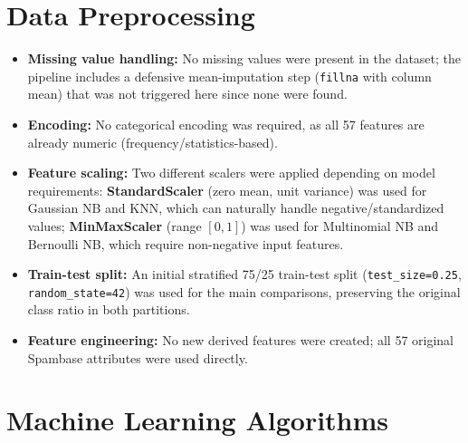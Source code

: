 \documentclass[12pt,a4paper]{article}
\begin{document}
\section{Data Preprocessing}
\begin{itemize}
\item \textbf{Missing value handling:} No missing values were present in the dataset;
the pipeline includes a defensive mean-imputation step (\texttt{fillna} with column
mean) that was not triggered here since none were found.
\item \textbf{Encoding:} No categorical encoding was required, as all 57 features are
already numeric (frequency/statistics-based).
\item \textbf{Feature scaling:} Two different scalers were applied depending on model
requirements: \textbf{StandardScaler} (zero mean, unit variance) was used for Gaussian
NB and KNN, which can naturally handle negative/standardized values; \textbf{MinMaxScaler}
(range $[0,1]$) was used for Multinomial NB and Bernoulli NB, which require non-negative
input features.
\item \textbf{Train-test split:} An initial stratified 75/25 train-test split
(\texttt{test\_size=0.25}, \texttt{random\_state=42}) was used for the main
comparisons, preserving the original class ratio in both partitions.
\item \textbf{Feature engineering:} No new derived features were created; all 57
original Spambase attributes were used directly.
\end{itemize}

\section{Machine Learning Algorithms}
\end{document}
